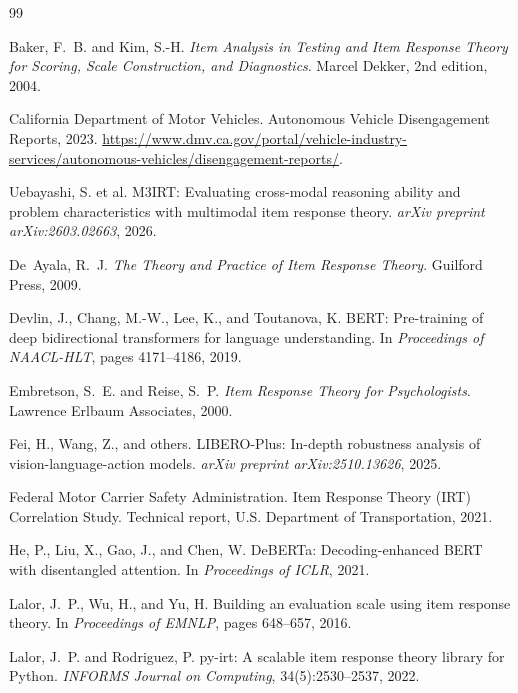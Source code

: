 \documentclass[11pt,a4paper]{article}
\begin{document}
\begin{thebibliography}{99}

 Baker, F.~B. and Kim, S.-H. \emph{Item Analysis in Testing and Item Response Theory for Scoring, Scale Construction, and Diagnostics}. Marcel Dekker, 2nd edition, 2004.

 California Department of Motor Vehicles. Autonomous Vehicle Disengagement Reports, 2023. \url{https://www.dmv.ca.gov/portal/vehicle-industry-services/autonomous-vehicles/disengagement-reports/}.

 Uebayashi, S. et al. M3IRT: Evaluating cross-modal reasoning ability and problem characteristics with multimodal item response theory. \emph{arXiv preprint arXiv:2603.02663}, 2026.

 De~Ayala, R.~J. \emph{The Theory and Practice of Item Response Theory}. Guilford Press, 2009.

 Devlin, J., Chang, M.-W., Lee, K., and Toutanova, K. BERT: Pre-training of deep bidirectional transformers for language understanding. In \emph{Proceedings of NAACL-HLT}, pages 4171--4186, 2019.

 Embretson, S.~E. and Reise, S.~P. \emph{Item Response Theory for Psychologists}. Lawrence Erlbaum Associates, 2000.

 Fei, H., Wang, Z., and others. LIBERO-Plus: In-depth robustness analysis of vision-language-action models. \emph{arXiv preprint arXiv:2510.13626}, 2025.

 Federal Motor Carrier Safety Administration. Item Response Theory (IRT) Correlation Study. Technical report, U.S. Department of Transportation, 2021.

 He, P., Liu, X., Gao, J., and Chen, W. DeBERTa: Decoding-enhanced BERT with disentangled attention. In \emph{Proceedings of ICLR}, 2021.

 Lalor, J.~P., Wu, H., and Yu, H. Building an evaluation scale using item response theory. In \emph{Proceedings of EMNLP}, pages 648--657, 2016.

 Lalor, J.~P. and Rodriguez, P. py-irt: A scalable item response theory library for Python. \emph{INFORMS Journal on Computing}, 34(5):2530--2537, 2022.


\end{thebibliography}
\end{document}
